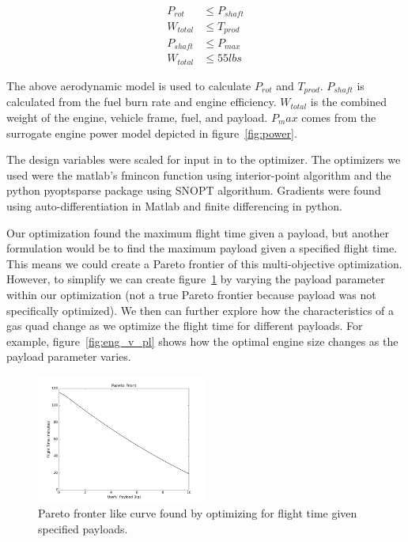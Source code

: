 \documentclass[letterpaper, 10 pt, conference]{ieeeconf}  %
\begin{document}
\[
	\begin{split}
	P_{rot} & \leq P_{shaft} \\
	W_{total} & \leq T_{prod} \\ 
	P_{shaft} & \leq P_{max} \\
	W_{total} & \leq 55 lbs
	\end{split}
\]

The above aerodynamic model is used to calculate $P_{rot}$ and $T_{prod}$. $P_{shaft}$ is calculated from the fuel burn rate and engine efficiency. $W_{total}$ is the combined weight of the engine, vehicle frame, fuel, and payload. $P_max$ comes from the surrogate engine power model depicted in figure~\ref{fig:power}.

The design variables were scaled for input in to the optimizer. The optimizers we used were the matlab's fmincon function using interior-point algorithm and the python pyoptsparse package using SNOPT algorithum. Gradients were found using auto-differentiation in Matlab and finite differencing in python. 

Our optimization found the maximum flight time given a payload, but another formulation would be to find the maximum payload given a specified flight time. This means we could create a Pareto frontier of this multi-objective optimization. However, to simplify we can create figure~\ref{fig:payload} by varying the payload parameter within our optimization (not a true Pareto frontier because payload was not specifically optimized). We then can further explore how the characteristics of a gas quad change as we optimize the flight time for different payloads. For example, figure~\ref{fig:eng_v_pl} shows how the optimal engine size changes as the payload parameter varies. 

\begin{figure}
	\includegraphics[width=0.5\textwidth]{pareto_front.png}
	\caption{Pareto fronter like curve found by optimizing for flight time given specified payloads.}
		\label{fig:payload}
\end{figure}
\end{document}

